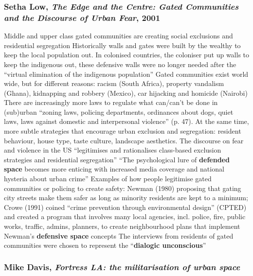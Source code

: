 \documentclass{article}
\begin{document}
\subsubsection{Setha Low, \textit{The Edge and the Centre: Gated Communities and the Discourse of Urban Fear}, 2001}

\begin{outline}
	\1 Middle and upper class gated communities are creating social exclusions and residential segregation
		\2 Historically walls and gates were built by the wealthy to keep the local population out. In colonised countries, the coloniser put up walls to keep the indigenous out, these defensive walls were no longer needed after the ``virtual elimination of the indigenous population''
		\2 Gated communities exist world wide, but for different reasons: racism (South Africa), property vandalism (Ghana), kidnapping and robbery (Mexico), car hijacking and homicide (Nairobi)
		\2 There are increasingly more laws to regulate what can/can't be done in (sub)urban ``zoning laws, policing departments, ordinances about dogs, quiet laws, laws against domestic and interpersonal violence'' (p. 47). At the same time, more subtle strategies that encourage urban exclusion and segregation: resident behaviour, house type, taste culture, landscape aesthetics. 
	\1 The discourse on fear and violence in the US ``legitimises and rationalises class-based exclusion strategies and residential segregation''
		\2 ``The psychological lure of \textbf{defended space} becomes more enticing with increased media coverage and national hysteria about urban crime'' 
	\1 Examples of how people legitimise gated communities or policing to create safety: Newman (1980) proposing that gating city streets make them safer as long as minority residents are kept to a minimum; Crowe (1991) coined ``crime prevention through environmental design'' (CPTED) and created a program that involves many local agencies, incl. police, fire, public works, traffic, admins, planners, to create neighbourhood plans that implement Newman's \textbf{defensive space} concepts
	\1 The interviews from residents of gated communities were chosen to represent the ``\textbf{dialogic unconscious}'' 
\end{outline}

\subsubsection{Mike Davis, \textit{Fortress LA: the militarisation of urban space}}
\end{document}
